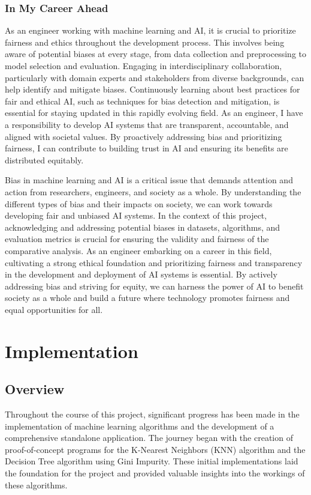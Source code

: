 \documentclass[letterpaper,10pt]{article}
\begin{document}
\subsubsection{In My Career Ahead}
As an engineer working with machine learning and AI, it is crucial to prioritize fairness and ethics throughout the development process. This involves being aware of potential biases at every stage, from data collection and preprocessing to model selection and evaluation. Engaging in interdisciplinary collaboration, particularly with domain experts and stakeholders from diverse backgrounds, can help identify and mitigate biases. Continuously learning about best practices for fair and ethical AI, such as techniques for bias detection and mitigation, is essential for staying updated in this rapidly evolving field. As an engineer, I have a responsibility to develop AI systems that are transparent, accountable, and aligned with societal values. By proactively addressing bias and prioritizing fairness, I can contribute to building trust in AI and ensuring its benefits are distributed equitably. \par

Bias in machine learning and AI is a critical issue that demands attention and action from researchers, engineers, and society as a whole. By understanding the different types of bias and their impacts on society, we can work towards developing fair and unbiased AI systems. In the context of this project, acknowledging and addressing potential biases in datasets, algorithms, and evaluation metrics is crucial for ensuring the validity and fairness of the comparative analysis. As an engineer embarking on a career in this field, cultivating a strong ethical foundation and prioritizing fairness and transparency in the development and deployment of AI systems is essential. By actively addressing bias and striving for equity, we can harness the power of AI to benefit society as a whole and build a future where technology promotes fairness and equal opportunities for all.\par

\newpage
\section{Implementation} \label{currentwork}
\subsection{Overview}


Throughout the course of this project, significant progress has been made in the implementation of machine learning algorithms and the development of a comprehensive standalone application. The journey began with the creation of proof-of-concept programs for the K-Nearest Neighbors (KNN) algorithm and the Decision Tree algorithm using Gini Impurity. These initial implementations laid the foundation for the project and provided valuable insights into the workings of these algorithms.\par
\end{document}
